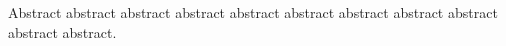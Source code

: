 \begin{eabstract}

Abstract abstract abstract abstract abstract abstract abstract abstract abstract abstract abstract.

\end{eabstract}
